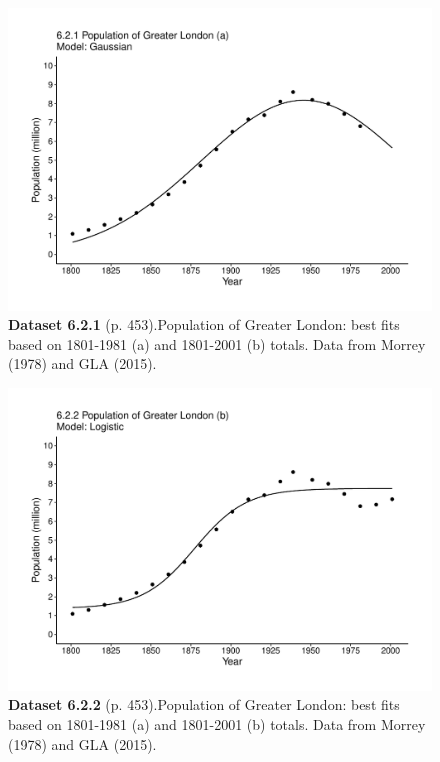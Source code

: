 \documentclass[aps,rmp,preprint,superscriptaddress,10pt,onecolumn]{article}
\begin{document}
\clearpage
\begin{figure}[h]
\includegraphics[width=\textwidth]{output/figs-ggplot/6.2.1.pdf}
\caption*{\textbf{Dataset 6.2.1} (p. 453).Population of Greater London: best fits based on 1801-1981 (a) and 1801-2001 (b) totals. Data from Morrey (1978) and GLA (2015). }
\end{figure}
	
\clearpage
\begin{figure}[h]
\includegraphics[width=\textwidth]{output/figs-ggplot/6.2.2.pdf}
\caption*{\textbf{Dataset 6.2.2} (p. 453).Population of Greater London: best fits based on 1801-1981 (a) and 1801-2001 (b) totals. Data from Morrey (1978) and GLA (2015). }
\end{figure}
	
\end{document}
